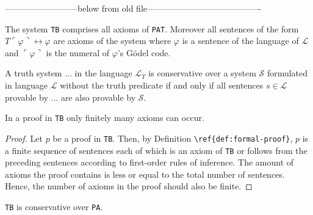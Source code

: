 --------------------------below from old file----------------------------------------

\begin{definition}[\texttt{TB}]
    The system \texttt{TB} comprises all axioms of \texttt{PAT}. Moreover all sentences of the form $T\ulcorner\varphi\urcorner \leftrightarrow \varphi$ are axioms of the system where $\varphi$ is a sentence of the language of $\mathcal{L}$ and $\ulcorner \varphi \urcorner$ is the numeral of $\varphi$'s Gödel code.
\end{definition}

\begin{definition}[conservativity]
    A truth system $...$ in the language $\mathcal{L}_T$ is conservative over a system $\mathcal{S}$ formulated in language $\mathcal{L}$ without the truth predicate if and only if all sentences $s \in \mathcal{L}$ provable by $...$ are also provable by $\mathcal{S}$.
\end{definition}

\begin{lemma}
    In a proof in \texttt{TB} only finitely many axioms can occur.
\end{lemma}

\begin{proof}
    Let $p$ be a proof in \texttt{TB}. Then, by Definition \verb|\ref{def:formal-proof}|, $p$ is a finite sequence of sentences each of which is an axiom of \texttt{TB} or follows from the preceding sentences according to first-order rules of inference. The amount of axioms the proof contains is less or equal to the total number of sentences. Hence, the number of axioms in the proof should also be finite. 
\end{proof}

\begin{theorem}
    \texttt{TB} is conservative over \texttt{PA}.
\end{theorem}

